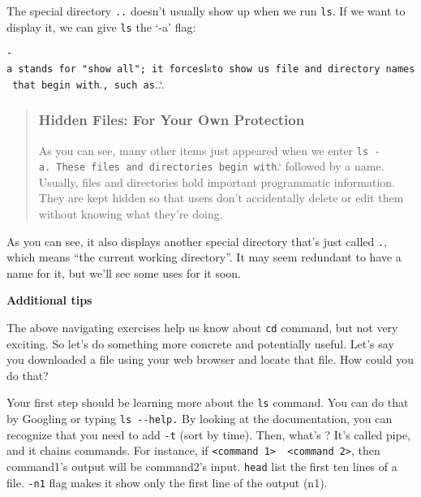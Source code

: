 \documentclass[
]{book}
\newenvironment{Shaded}{\begin{snugshade}}{\end{snugshade}}
\newcommand{\AttributeTok}[1]{\textcolor[rgb]{0.77,0.63,0.00}{#1}}
\newcommand{\BuiltInTok}[1]{#1}
\newcommand{\ExtensionTok}[1]{#1}
\newcommand{\NormalTok}[1]{#1}
\begin{document}
The special directory \texttt{..} doesn't usually show up when we run \texttt{ls}. If we want to display it, we can give \texttt{ls} the `-a' flag:

\begin{Shaded}
\end{Shaded}

\texttt{-a\textquotesingle{}\ stands\ for\ "show\ all";\ it\ forces}ls\texttt{to\ show\ us\ file\ and\ directory\ names\ that\ begin\ with}.\texttt{,\ such\ as}..`.

\begin{quote}
\hypertarget{hidden-files-for-your-own-protection}{%
\subsubsection{Hidden Files: For Your Own Protection}\label{hidden-files-for-your-own-protection}}

As you can see, many other items just appeared when we enter \texttt{ls\ -a\textquotesingle{}.\ These\ files\ and\ directories\ begin\ with}.` followed by a name. Usually, files and directories hold important programmatic information. They are kept hidden so that users don't accidentally delete or edit them without knowing what they're doing.
\end{quote}

As you can see, it also displays another special directory that's just called \texttt{.}, which means ``the current working directory''. It may seem redundant to have a name for it, but we'll see some uses for it soon.

\textbf{Additional tips}

The above navigating exercises help us know about \texttt{cd} command, but not very exciting. So let's do something more concrete and potentially useful. Let's say you downloaded a file using your web browser and locate that file. How could you do that?

Your first step should be learning more about the \texttt{ls} command. You can do that by Googling or typing \texttt{ls\ -\/-help.} By looking at the documentation, you can recognize that you need to add \texttt{-t} (sort by time). Then, what's \texttt{\textbar{}}? It's called pipe, and it chains commands. For instance, if \texttt{\textless{}command\ 1\textgreater{}\ \textbar{}\ \textless{}command\ 2\textgreater{}}, then command1's output will be command2's input. \texttt{head} list the first ten lines of a file. \texttt{-n1} flag makes it show only the first line of the output (n1).
\end{document}
